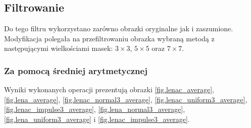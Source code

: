 \documentclass{classrep}
\begin{document}
\subsection{Filtrowanie}
Do tego filtru wykorzystano zarówno obrazki oryginalne jak i zaszumione. Modyfikacja polegała na przefiltrowaniu obrazka wybraną metodą z następującymi wielkościami masek: $3 \times 3$, $5 \times 5$ oraz $7 \times 7$.

\subsubsection{Za pomocą średniej arytmetycznej}
Wyniki wykonanych operacji prezentują obrazki \ref{fig.lenac_average}, \ref{fig.lena_average}, \ref{fig.lenac_normal3_average}, \ref{fig.lenac_uniform3_average}, \ref{fig.lenac_impulse3_average}, \ref{fig.lena_normal3_average}, \ref{fig.lena_uniform3_average} i \ref{fig.lenac_impulse3_average}.

\end{document}
